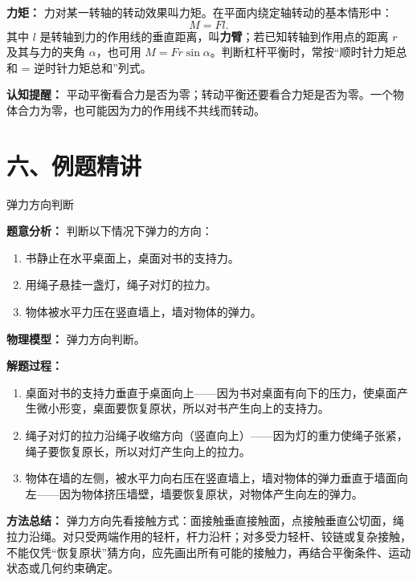 \textbf{力矩：} 力对某一转轴的转动效果叫力矩。在平面内绕定轴转动的基本情形中：
\[
M=Fl.
\]
其中 $l$ 是转轴到力的作用线的垂直距离，叫\textbf{力臂}；若已知转轴到作用点的距离 $r$ 及其与力的夹角 $\alpha$，也可用 $M=Fr\sin\alpha$。判断杠杆平衡时，常按“顺时针力矩总和 = 逆时针力矩总和”列式。

\textbf{认知提醒：} 平动平衡看合力是否为零；转动平衡还要看合力矩是否为零。一个物体合力为零，也可能因为力的作用线不共线而转动。

\section*{六、例题精讲}

\begin{examplebox}{弹力方向判断}

\textbf{题意分析：} 判断以下情况下弹力的方向：
\begin{enumerate}
  \item 书静止在水平桌面上，桌面对书的支持力。
  \item 用绳子悬挂一盏灯，绳子对灯的拉力。
  \item 物体被水平力压在竖直墙上，墙对物体的弹力。
\end{enumerate}

\textbf{物理模型：} 弹力方向判断。

\textbf{解题过程：}
\begin{enumerate}
  \item 桌面对书的支持力垂直于桌面向上——因为书对桌面有向下的压力，使桌面产生微小形变，桌面要恢复原状，所以对书产生向上的支持力。
  \item 绳子对灯的拉力沿绳子收缩方向（竖直向上）——因为灯的重力使绳子张紧，绳子要恢复原长，所以对灯产生向上的拉力。
  \item 物体在墙的左侧，被水平力向右压在竖直墙上，墙对物体的弹力垂直于墙面向左——因为物体挤压墙壁，墙要恢复原状，对物体产生向左的弹力。
\end{enumerate}

\textbf{方法总结：} 弹力方向先看接触方式：面接触垂直接触面，点接触垂直公切面，绳拉力沿绳。对只受两端作用的轻杆，杆力沿杆；对多受力轻杆、铰链或复杂接触，不能仅凭“恢复原状”猜方向，应先画出所有可能的接触力，再结合平衡条件、运动状态或几何约束确定。

\end{examplebox}

